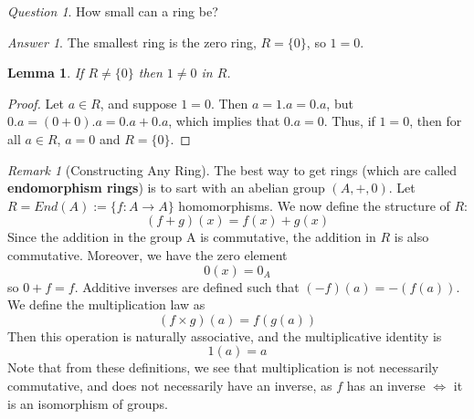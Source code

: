 \documentclass[12pt]{article}
\newtheorem{lem}[thm]{Lemma}  %
\theoremstyle{definition}
\theoremstyle{remark}
\newtheorem{rmk}[thm]{Remark}
\newtheorem*{qst}{Question}
\newtheorem*{ans}{Answer}
\numberwithin{equation}{section}
\newcommand\B[1]{\textbf{ #1}}
\begin{document}
\vspace{15pt}


\begin{qst}
        How small can a ring be?
\end{qst}
\begin{ans}
        The smallest ring is the zero ring, $R = \{0\}$, so $1 = 0$.
\end{ans}

\vspace{15pt}

\begin{lem}
        If $R \neq \{0\}$ then $1 \neq 0$ in $R$.
\end{lem}
\begin{proof}
        Let $a \in R$, and suppose $1 = 0$. Then $a = 1.a = 0.a$, but $0.a = (0+0).a = 0.a+0.a$, which implies that $0.a = 0$. Thus, if $1 = 0$, then for all $a \in R$, $a = 0$ and $R = \{0\}$.
\end{proof}

\vspace{15pt}

\begin{rmk}[Constructing Any Ring]
        The best way to get rings (which are called \B{endomorphism rings}) is to sart with an abelian group $(A,+,0)$. Let $R = End(A) := \{f:A \rightarrow A\}$ homomorphisms. We now define the structure of $R$:\begin{equation}
                (f+g)(x) = f(x) + g(x)
        \end{equation}
        Since the addition in the group A is commutative, the addition in $R$ is also commutative. Moreover, we have the zero element \begin{equation}
                0(x) = 0_A
        \end{equation}
        so $0+f=f$. Additive inverses are defined such that $(-f)(a) = -(f(a))$. We define the multiplication law as \begin{equation}
                (f\times g)(a) = f(g(a))
        \end{equation}
        Then this operation is naturally associative, and the multiplicative identity is \begin{equation}
                1(a) = a
        \end{equation}
        Note that from these definitions, we see that multiplication is not necessarily commutative, and does not necessarily have an inverse, as $f$ has an inverse $\iff$ it is an isomorphism of groups. 
\end{rmk}
\end{document}
